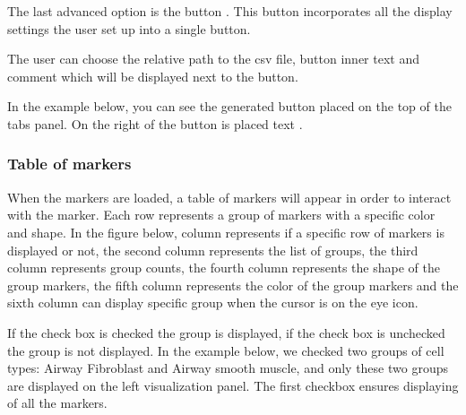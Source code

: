 \documentclass[letterpaper,10pt,english,openany,oneside]{sphinxmanual}
\begin{document}
\sphinxAtStartPar
The last advanced option is the button . This button incorporates all the display settings the user set up into a single button.

\sphinxAtStartPar
{}

\sphinxAtStartPar
The user can choose the relative path to the csv file, button inner text and comment which will be displayed next to the button.

\sphinxAtStartPar
{}

\sphinxAtStartPar
In the example below, you can see the generated button  placed on the top of the tabs panel. On the right of the button is placed text .

\sphinxAtStartPar
{}


\subsubsection{Table of markers}
\label{\detokenize{docs/starting/markers:table-of-markers}}
\sphinxAtStartPar
When the markers are loaded, a table of markers will appear in order to interact with the marker. Each row represents a group of markers with a specific color and shape. In the figure below, column  represents if a specific row of markers is displayed or not, the second column  represents the list of groups, the third column  represents group counts, the fourth column  represents the shape of the group markers, the fifth column  represents the color of the group markers and the sixth column  can display specific group when the cursor is on the eye icon.

\sphinxAtStartPar
{}

\sphinxAtStartPar
If the check box is checked \sphinxhyphen{} the group is displayed, if the check box is unchecked \sphinxhyphen{} the group is not displayed. In the example below, we checked two groups of cell types: Airway Fibroblast and Airway smooth muscle, and only these two groups are displayed on the left visualization panel. The first checkbox  ensures displaying of all the markers.

\sphinxAtStartPar
{}
\end{document}
